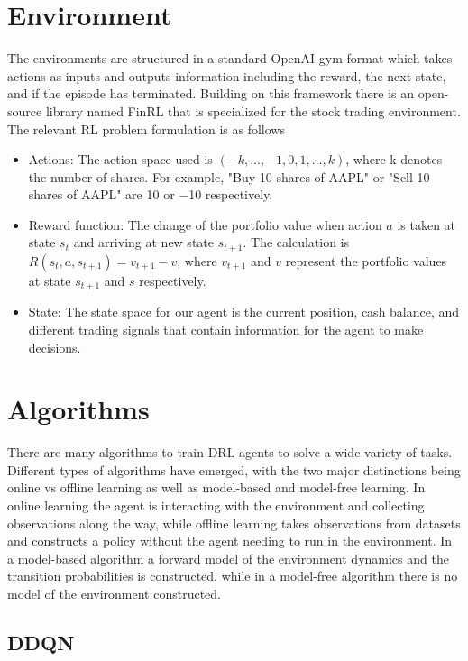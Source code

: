 \documentclass[a4paper]{article}
\begin{document}
\section{Environment}

The environments are structured in a standard OpenAI gym format which takes actions as inputs and outputs information including the reward, the next state, and if the episode has terminated. Building on this framework there is an open-source library named FinRL that is specialized for the stock trading environment. The relevant RL problem formulation is as follows

\begin{itemize}
	\item Actions: The action space used is $(−k, ..., −1, 0, 1, ..., k)$, where k denotes the number of shares. For example, "Buy 10 shares of AAPL" or "Sell 10 shares of AAPL" are 10 or −10 respectively.
	\item Reward function: The change of the portfolio value when action $a$ is taken at state $s_t$ and arriving at new state $s_{t+1}$. The calculation is $R(s_t, a, s_{t+1}) = v_{t+1} − v$, where $v_{t+1}$ and $v$ represent the portfolio values at state $s_{t+1}$ and $s$ respectively.
	\item State: The state space for our agent is the current position, cash balance, and different trading signals that contain information for the agent to make decisions.
\end{itemize}

\section{Algorithms}

There are many algorithms to train DRL agents to solve a wide variety of tasks. Different types of algorithms have emerged, with the two major distinctions being online vs offline learning as well as model-based and model-free learning. In online learning the agent is interacting with the environment and collecting observations along the way, while offline learning takes observations from datasets and constructs a policy without the agent needing to run in the environment. In a model-based algorithm a forward model of the environment dynamics and the transition probabilities is constructed, while in a model-free algorithm there is no model of the environment constructed.

\subsection{DDQN}
\end{document}
